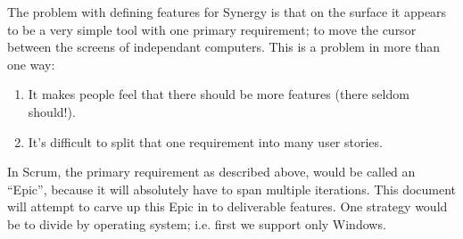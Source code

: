 \documentclass{article}
\begin{document}
The problem with defining features for Synergy is that on the surface it appears
to be a very simple tool with one primary requirement; to move the cursor 
between the screens of independant computers. This is a problem in more than one
way:

\begin{enumerate}
\item It makes people feel that there should be more features (there seldom
 should!).
\item It's difficult to split that one requirement into many user stories.
\end{enumerate}

In Scrum, the primary requirement as described above, would be called an
 ``Epic'', because it will absolutely have to span multiple iterations. This
document will attempt to carve up this Epic in to deliverable features. One
strategy would be to divide by operating system; i.e. first we support only
Windows.
\end{document}
